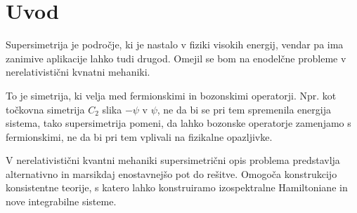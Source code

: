 \section{Uvod}

Supersimetrija je podro\v cje, ki je nastalo v fiziki visokih energij, vendar pa ima zanimive aplikacije lahko
tudi drugod. Omejil se bom na enodel\v cne probleme v nerelativisti\v cni kvnatni mehaniki.

To je simetrija, ki velja med fermionskimi in bozonskimi operatorji. Npr. kot to\v ckovna
simetrija $C_2$ slika $-\psi$ v $\psi$, ne da bi se pri tem spremenila energija sistema, tako supersimetrija pomeni, da lahko bozonske
operatorje zamenjamo s fermionskimi, ne da bi pri tem vplivali na fizikalne opazljivke.

V nerelativisti\v cni kvantni mehaniki supersimetri\v cni opis problema predstavlja alternativno in marsikdaj
enostavnej\v so pot do re\v sitve. Omogo\v ca konstrukcijo konsistentne teorije, s katero lahko konstruiramo izospektralne
Hamiltoniane in nove integrabilne sisteme.

